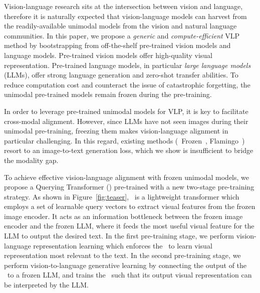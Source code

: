 Vision-language research sits at the intersection between vision and language,
therefore it is naturally expected that vision-language models can harvest from the readily-available unimodal models from the vision and natural language communities.
In this paper, we propose a \textit{generic} and \textit{compute-efficient} VLP method by 
bootstrapping from off-the-shelf pre-trained vision models and language models.
Pre-trained vision models offer high-quality visual representation.
Pre-trained language models, in particular \textit{large language models} (LLMs), offer strong language generation and zero-shot transfer abilities.
To reduce computation cost and counteract the issue of catastrophic forgetting, the unimodal pre-trained models remain frozen during the pre-training.

In order to leverage pre-trained unimodal models for VLP, it is key to facilitate cross-modal alignment.
%
However, since LLMs have not seen images during their unimodal pre-training, 
freezing them makes vision-language alignment in particular challenging.
%
In this regard, existing methods (\eg~Frozen~\cite{Frozen}, Flamingo~\cite{flamingo}) resort to an image-to-text generation loss,
which we show is insufficient to bridge the modality gap.

To achieve effective vision-language alignment with frozen unimodal models, we propose a Querying Transformer (\name) pre-trained with a new two-stage pre-training strategy.
%
As shown in Figure~\ref{fig:teaser},
\name~is a lightweight transformer which employs a set of learnable query vectors to extract visual features from the frozen image encoder.
It acts as an information bottleneck between the frozen image encoder and the frozen LLM,
where it feeds the most useful visual feature for the LLM to output the desired text.
In the first pre-training stage,
we perform vision-language representation learning
which enforces the \name~to learn visual representation most relevant to the text.
In the second pre-training stage,
we perform vision-to-language generative learning by connecting the output of the \name~to a frozen LLM,
and trains the \name~such that its output visual representation can be interpreted by the LLM.



